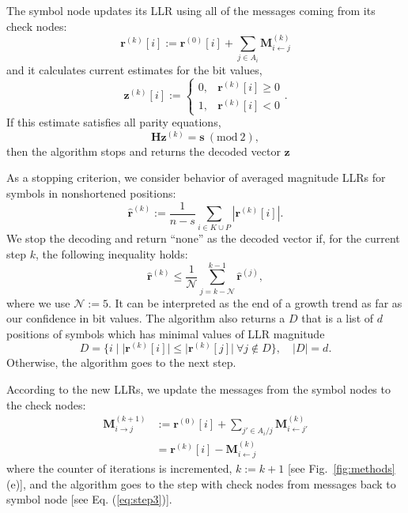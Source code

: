 \documentclass[aps,pra,twocolumn,amsmath,amssymb,nofootinbib,showpacs,superscriptaddress]{revtex4-1}
\renewcommand{\sb}{\mathbf{s}}
\newcommand{\Hb}{\mathbf{H}}
\newcommand{\rb}{\mathbf{r}}
\newcommand{\zb}{\mathbf{z}}
\newcommand{\Mb}{\mathbf{M}}
\begin{document}
The symbol node updates its LLR using all of the messages coming from its check nodes:
\begin{equation}\label{eq:step3}
	\rb^{(k)}[i] := \rb^{(0)}[i]+\sum_{j\in A_i} \Mb_{i\leftarrow j}^{(k)}
\end{equation}
and it calculates current estimates for the bit values,
\begin{equation}
	\zb^{(k)}[i] := \begin{cases}
		0, &\rb^{(k)}[i]\geq0 \\
		1, &\rb^{(k)}[i]<0
	\end{cases}.
\end{equation}
If this estimate satisfies all parity equations, 
\begin{equation}
	\Hb\zb^{(k)}=\sb~(\mathrm{mod}~2), 
\end{equation}
then the algorithm stops and returns the decoded vector $\zb$

As a stopping criterion, we consider behavior of averaged magnitude LLRs for symbols in nonshortened positions:
\begin{equation}
	\hat{\mathbf{r}}^{(k)}:=\frac{1}{n-s}\sum_{i\in K\cup P}|\rb^{(k)}[i]|.
\end{equation}
We stop the decoding and return ``none'' as the decoded vector if, for the current step $k$, the following inequality holds:
\begin{equation}
	\hat{\mathbf{r}}^{(k)}\leq\frac{1}{\mathcal{N}}\sum_{j=k-\mathcal{N}}^{k-1}\hat{\mathbf{r}}^{(j)},
\end{equation}
where we use $\mathcal{N}:=5$.
It can be interpreted as the end of a growth trend as far as our confidence in bit values. 
The algorithm also returns a $D$ that is a list of $d$ positions of symbols which has minimal values of LLR magnitude
\begin{equation}
	D = \{i\;|\;|\rb^{(k)}[i]|\leq |\rb^{(k)}[j]| ~\forall j\notin D \}, \quad |D| = d.
\end{equation}
Otherwise, the algorithm goes to the next step.

According to the new LLRs, we update the messages from the symbol nodes to the check nodes:
\begin{equation}
\begin{split}
	\Mb_{i\rightarrow j}^{(k+1)} &:= \rb^{(0)}[i]+\sum_{j'\in A_i/j} \Mb_{i\leftarrow j'}^{(k)} \\
	&= \rb^{(k)}[i]-\Mb_{i\leftarrow j}^{(k)}
\end{split}
\end{equation}
where the counter of iterations is incremented, $k:=k+1$ [see Fig.~\ref{fig:methods}(e)], and the algorithm goes to the step with check nodes from messages back to symbol node [see Eq. (\ref{eq:step3})].
\end{document}
